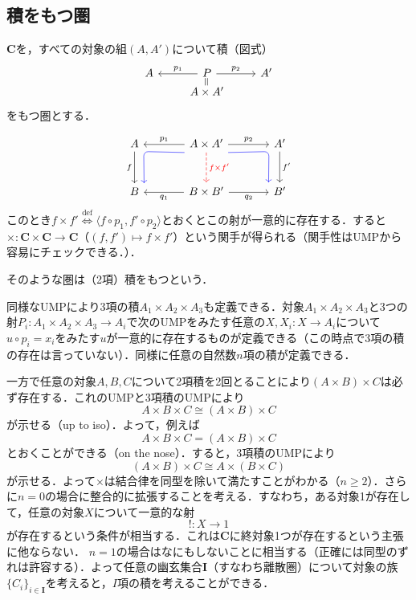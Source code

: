 \documentclass[dvipdfmx,a4j,10pt]{jsarticle}
\theoremstyle{mystyle1}
\theoremstyle{mystyle2}
\newcommand{\defLeftrightarrow}{\overset{\text{def}}{\iff}}
\begin{document}
	\subsection{積をもつ圏}

$\mathbf{C}$を，すべての対象の組$(A,A')$について積（図式）
	\begin{equation}
		\begin{tikzcd}[row sep=0.4ex]
			A & P \arrow[l,"p_1"'] \arrow[r,"p_2"] \arrow[d,phantom,"\rotatebox{90}{$=$}"]& A' \\
			& A\times A' &
		\end{tikzcd}
	\end{equation}
	をもつ圏とする．

	\begin{equation}
		\begin{tikzcd}[row sep=large,column sep=large]
			|[alias=A]| A \arrow[d,"f"'] & A\times A' \arrow[l,"p_1"'] \arrow[r,"p_2"]
			\arrow[ld,blue,rounded corners,to path={(\tikztostart.south west)--(A.south east)--(\tikztotarget.north east)}]
			\arrow[rd,blue,rounded corners,to path={(\tikztostart.south east)--(Ad.south west)--(\tikztotarget.north west)}]
			\arrow[d,red,dashed,"f\times f'"] & |[alias=Ad]| A' \arrow[d,"f'"] \\
			B & B\times B' \arrow[l,"q_1"] \arrow[r,"q_2"'] & B'
		\end{tikzcd}
	\end{equation}
	このとき$f\times f'\defLeftrightarrow \langle f\circ p_1,f'\circ p_2\rangle$とおくとこの射が一意的に存在する．すると$\times:\mathbf{C}\times\mathbf{C}\to \mathbf{C}$（$(f,f')\mapsto f\times f'$）という関手が得られる（関手性はUMPから容易にチェックできる．）．

	そのような圏は（2項）積をもつという．

	同様なUMPにより3項の積$A_1\times A_2\times A_3$も定義できる．対象$A_1\times A_2\times A_3$と3つの射$P_i:A_1\times A_2\times A_3\to A_i$で次のUMPをみたす任意の$X,X_i:X\to A_i$について$u\circ p_i=x_i$をみたす$u$が一意的に存在するものが定義できる（この時点で3項の積の存在は言っていない）．同様に任意の自然数$n$項の積が定義できる．

	一方で任意の対象$A,B,C$について2項積を2回とることにより$(A\times B)\times C$は必ず存在する．これのUMPと3項積のUMPにより
	\[
		A\times B\times C\cong (A\times B)\times C
	\]
	が示せる（up to iso）．よって，例えば
	\[
		A\times B\times C=(A\times B)\times C
	\]
	とおくことができる（on the nose）．すると，3項積のUMPにより
	\[
		(A\times B)	\times C\cong A\times (B\times C)
	\]
	が示せる．よって$\times$は結合律を同型を除いて満たすことがわかる（$n\geq 2$）．さらに$n=0$の場合に整合的に拡張することを考える．すなわち，ある対象1が存在して，任意の対象$X$について一意的な射
	\[
		!:X\to 1
	\]
	が存在するという条件が相当する．これは$\mathbf{C}$に終対象1つが存在するという主張に他ならない．
$n=1$の場合はなにもしないことに相当する（正確には同型のずれは許容する）．よって任意の幽玄集合$\mathbf{I}$（すなわち離散圏）について対象の族$\{C_i\}_{i\in\mathbf{I}}$を考えると，$I$項の積を考えることができる．
\end{document}
